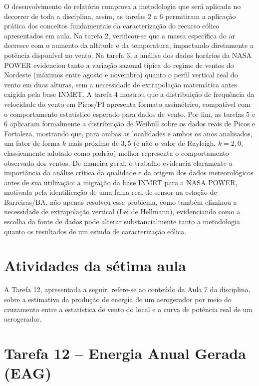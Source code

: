 \documentclass[11pt,a4paper]{article}
\begin{document}
O desenvolvimento do relatório comprova a metodologia que será aplicada no decorrer de toda a disciplina, assim, as tarefas 2 a 6 permitiram a aplicação prática dos conceitos fundamentais da caracterização do recurso eólico apresentados em aula. Na tarefa 2, verificou-se que a massa específica do
ar decresce com o aumento da altitude e da temperatura, impactando
diretamente a potência disponível no vento. Na tarefa 3, a análise dos
dados horários da NASA POWER evidenciou tanto a variação sazonal
típica do regime de ventos do Nordeste (máximos entre agosto e novembro)
quanto o perfil vertical real do vento em duas alturas, sem a necessidade de
extrapolação matemática antes exigida pela base INMET. A tarefa 4 mostrou
que a distribuição de frequência da velocidade do vento em Picos/PI
apresenta formato assimétrico, compatível com o comportamento estatístico
esperado para dados de vento. Por fim, as tarefas 5 e 6 aplicaram
formalmente a distribuição de Weibull sobre os dados reais de Picos e
Fortaleza, mostrando que, para ambas as localidades e ambos os anos
analisados, um fator de forma $k$ mais próximo de $3{,}5$ (e não o valor de
Rayleigh, $k=2{,}0$, classicamente adotado como padrão) melhor representa o
comportamento observado dos ventos.
De maneira geral, o trabalho evidencia claramente a importância da análise crítica da qualidade e da origem dos dados meteorológicos antes de sua utilização: a migração da base INMET para a NASA POWER, motivada pela identificação de uma falha real de sensor na estação de Barreiras/BA, não apenas resolveu esse problema, como também eliminou a necessidade de extrapolação vertical (Lei de Hellmann), evidenciando como a escolha da fonte de dados pode alterar substancialmente tanto a metodologia quanto os resultados de um estudo de caracterização eólica.


\newpage
\section{Atividades da sétima aula}

A Tarefa 12, apresentada a seguir, refere-se ao conteúdo da Aula 7 da
disciplina, sobre a estimativa da produção de energia de um aerogerador
por meio do cruzamento entre a estatística de vento do local e a curva
de potência real de um aerogerador.

\section{Tarefa 12 -- Energia Anual Gerada (EAG)}
\end{document}

